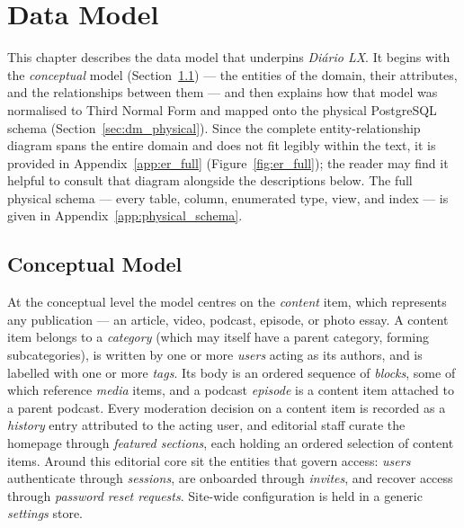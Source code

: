 %
%
\chapter{Data Model} \label{cap:datamodel}

This chapter describes the data model that underpins \textit{Diário LX}. It begins with
the \emph{conceptual} model (Section~\ref{sec:dm_conceptual}) --- the entities of the domain,
their attributes, and the relationships between them --- and then explains how that model was
normalised to Third Normal Form and mapped onto the physical PostgreSQL schema
(Section~\ref{sec:dm_physical}). Since the complete entity-relationship diagram spans the
entire domain and does not fit legibly within the text, it is provided in
Appendix~\ref{app:er_full} (Figure~\ref{fig:er_full}); the reader may find it helpful to
consult that diagram alongside the descriptions below. The full physical schema --- every
table, column, enumerated type, view, and index --- is given in
Appendix~\ref{app:physical_schema}.

\section{Conceptual Model} \label{sec:dm_conceptual}

At the conceptual level the model centres on the \emph{content} item, which represents any
publication --- an article, video, podcast, episode, or photo essay. A content item
belongs to a \emph{category} (which may itself have a parent category, forming
subcategories), is written by one or more \emph{users} acting as its authors, and is
labelled with one or more \emph{tags}. Its body is an ordered sequence of \emph{blocks},
some of which reference \emph{media} items, and a podcast \emph{episode} is a content item
attached to a parent podcast. Every moderation decision on a content item is recorded as a
\emph{history} entry attributed to the acting user, and editorial staff curate the homepage
through \emph{featured sections}, each holding an ordered selection of content items. Around
this editorial core sit the entities that govern access: \emph{users} authenticate through
\emph{sessions}, are onboarded through \emph{invites}, and recover access through
\emph{password reset requests}. Site-wide configuration is held in a generic \emph{settings}
store.

